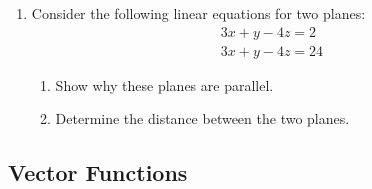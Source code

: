 \documentclass[letterpaper,12pt,fleqn]{article}
\begin{document}
\begin{enumerate}
\item Consider the following linear equations for two planes:
  \begin{gather*}
    3x+y-4z=2 \\
    3x+y-4z=24
  \end{gather*}
  \begin{enumerate}
  \item Show why these planes are parallel.
  \item Determine the distance between the two planes.
  \end{enumerate}
\end{enumerate}

\subsection*{Vector Functions}
\end{document}
